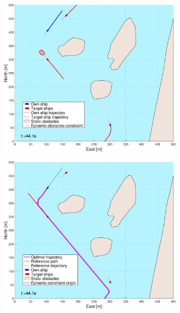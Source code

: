 \begin{figure}[!ht] %
    \begin{subfigure}[b]{0.494\textwidth}
        \centering
        \includegraphics[width=\textwidth]{Images/NewFigures/Helloya_Rev/_Simple_1fig1_time=45}
        \subcaption{}
    \end{subfigure}
    \hfill
    \begin{subfigure}[b]{0.494\textwidth}
        \centering
        \includegraphics[width=\textwidth]{Images/NewFigures/Helloya_Rev/_Simple_1fig999_time=45}

\end{subfigure}
\end{figure}
